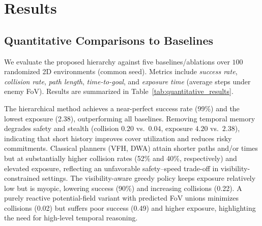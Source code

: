 \documentclass[letterpaper, 10 pt, conference]{ieeeconf}
\begin{document}
\section{Results}

\subsection{Quantitative Comparisons to Baselines}
We evaluate the proposed hierarchy against five baselines/ablations over $100$ randomized 2D environments (common seed). Metrics include \emph{success rate}, \emph{collision rate}, \emph{path length}, \emph{time-to-goal}, and \emph{exposure time} (average steps under enemy FoV). Results are summarized in Table~\ref{tab:quantitative_results}.

The hierarchical method achieves a near-perfect success rate (99\%) and the lowest exposure (2.38), outperforming all baselines. Removing temporal memory degrades safety and stealth (collision $0.20$ vs.\ $0.04$, exposure $4.20$ vs.\ $2.38$), indicating that short history improves cover utilization and reduces risky commitments. Classical planners (VFH, DWA) attain shorter paths and/or times but at substantially higher collision rates (52\% and 40\%, respectively) and elevated exposure, reflecting an unfavorable safety--speed trade-off in visibility-constrained settings. The visibility-aware greedy policy keeps exposure relatively low but is myopic, lowering success (90\%) and increasing collisions (0.22). A purely reactive potential-field variant with predicted FoV unions minimizes collisions (0.02) but suffers poor success (0.49) and higher exposure, highlighting the need for high-level temporal reasoning.
\end{document}
